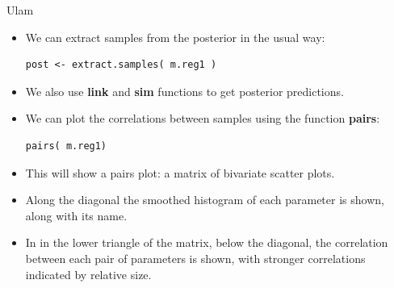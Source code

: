 \documentclass[handout]{beamer}
\begin{document}
\begin{frame}[fragile]{Ulam}
\scriptsize{


\begin{itemize}


\item We can extract samples from the posterior in the usual way:

\begin{verbatim}
post <- extract.samples( m.reg1 )
\end{verbatim}

\item We also use \textbf{link} and \textbf{sim} functions to get posterior predictions.

\item  We can plot the correlations between samples using the function \textbf{pairs}:

\begin{verbatim}
pairs( m.reg1)
\end{verbatim}

\item This will show a pairs plot: a matrix of bivariate scatter plots. \item Along the diagonal the smoothed histogram of each parameter is shown, along with its name.
\item In in the lower triangle of the matrix, below the diagonal, the correlation between each pair of parameters is shown, with stronger correlations indicated by relative size.

 \end{itemize}




} 
\end{frame}
\end{document}
